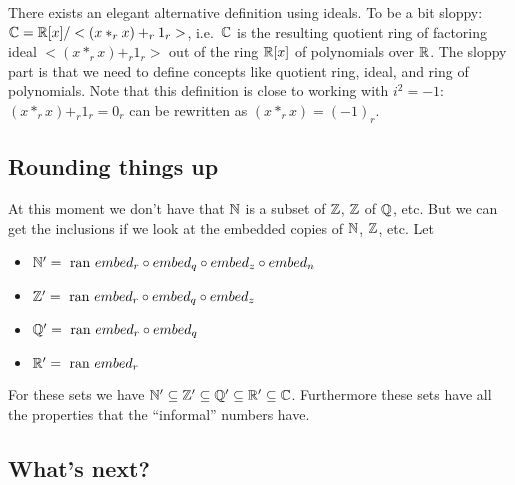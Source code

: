 There exists an elegant alternative definition using ideals. To be a bit
sloppy: $\mathbb C = \mathbb R[x] / <(x *_r x) +_r 1_r>$, i.e.\ $\mathbb C$ is the resulting
quotient ring of factoring ideal $<(x *_r x) +_r 1_r>$ out of the ring
$\mathbb R[x]$ of polynomials over $\mathbb R$. The sloppy part is that we need to
define concepts like quotient ring, ideal, and ring of polynomials. Note
that this definition is close to working with $i^2=-1$: $(x *_r x) +_r
1_r = 0_r$ can be rewritten as $(x *_r x) = (-1)_r$.

\subsection{Rounding things up}

At this moment we don't have that $\mathbb N$ is a subset of $\mathbb Z$, $\mathbb Z$ of
$\mathbb Q$, etc. But we can get the inclusions if we look at the embedded
copies of $\mathbb N$, $\mathbb Z$, etc. Let
\begin{itemize}
  \item $\mathbb N' = \mbox{ ran } embed_r \circ embed_q \circ embed_z \circ embed_n$
  \item $\mathbb Z' = \mbox{ ran } embed_r \circ embed_q \circ embed_z$
  \item $\mathbb Q' = \mbox{ ran } embed_r \circ embed_q$
  \item $\mathbb R' = \mbox{ ran } embed_r$
\end{itemize}
For these sets we have $\mathbb N' \subseteq \mathbb Z' \subseteq \mathbb Q' \subseteq \mathbb R'
\subseteq \mathbb C$. Furthermore these sets have all the properties that the
``informal'' numbers have.

\subsection{What's next?}

